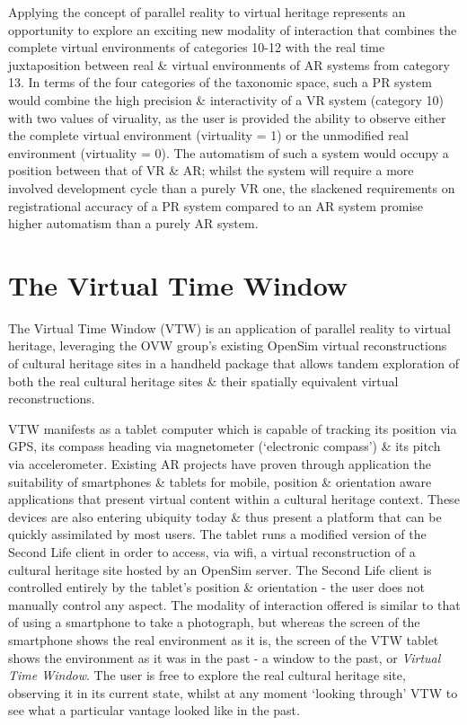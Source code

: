 Applying the concept of parallel reality to virtual heritage represents an opportunity to explore an exciting new modality of interaction that combines the complete virtual environments of categories 10-12 with the real time juxtaposition between real \& virtual environments of AR systems from category 13. In terms of the four categories of the taxonomic space, such a PR system would combine the high precision \& interactivity of a VR system (category 10) with two values of viruality, as the user is provided the ability to observe either the complete virtual environment (virtuality = 1) or the unmodified real environment (virtuality = 0). The automatism of such a system would occupy a position between that of VR \& AR; whilst the system will require a more involved development cycle than a purely VR one, the slackened requirements on registrational accuracy of a PR system compared to an AR system promise higher automatism than a purely AR system.


\section{The Virtual Time Window}
The Virtual Time Window (VTW) is an application of parallel reality to virtual heritage, leveraging the OVW group's existing OpenSim virtual reconstructions of cultural heritage sites in a handheld package that allows tandem exploration of both the real cultural heritage sites \& their spatially equivalent virtual reconstructions.

VTW manifests as a tablet computer which is capable of tracking its position via GPS, its compass heading via magnetometer (`electronic compass') \& its pitch via accelerometer. Existing AR projects have proven through application the suitability of smartphones \& tablets for mobile, position \& orientation aware applications that present virtual content within a cultural heritage context. These devices are also entering ubiquity today \& thus present a platform that can be quickly assimilated by most users. The tablet runs a modified version of the Second Life client in order to access, via wifi, a virtual reconstruction of a cultural heritage site hosted by an OpenSim server. The Second Life client is controlled entirely by the tablet's position \& orientation - the user does not manually control any aspect. The modality of interaction offered is similar to that of using a smartphone to take a photograph, but whereas the screen of the smartphone shows the real environment as it is, the screen of the VTW tablet shows the environment as it was in the past - a window to the past, or \textit{Virtual Time Window}. The user is free to explore the real cultural heritage site, observing it in its current state, whilst at any moment `looking through' VTW to see what a particular vantage looked like in the past.

